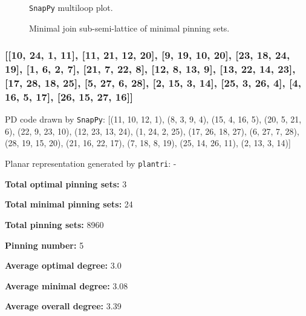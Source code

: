\documentclass{article}%
\begin{document}
\begin{multicols}{2}
\begin{figure}[H]
\centering

\caption{\texttt{SnapPy} multiloop plot.}
\label{fig:tex/img/[[7, 22, 8, 1], [13, 6, 14, 7], [14, 21, 15, 22], [8, 15, 9, 16], [1, 16, 2, 17], [12, 28, 13, 23], [5, 27, 6, 28], [20, 26, 21, 27], [9, 26, 10, 25], [2, 25, 3, 24], [17, 24, 18, 23], [4, 11, 5, 12],.svg}
\end{figure}
\columnbreak

\begin{figure}[H]
\centering
\scalebox{0.8}{}
\caption{Minimal join sub-semi-lattice of minimal pinning sets.}
\label{fig:tex/img/[[7, 22, 8, 1], [13, 6, 14, 7], [14, 21, 15, 22], [8, 15, 9, 16], [1, 16, 2, 17], [12, 28, 13, 23], [5, 27, 6, 28], [20, 26, 21, 27], [9, 26, 10, 25], [2, 25, 3, 24], [17, 24, 18, 23], [4, 11, 5, 12],.pgf}
\end{figure}
\end{multicols}

\newpage

\subsubsection{[[10, 24, 1, 11], [11, 21, 12, 20], [9, 19, 10, 20], [23, 18, 24, 19], [1, 6, 2, 7], [21, 7, 22, 8], [12, 8, 13, 9], [13, 22, 14, 23], [17, 28, 18, 25], [5, 27, 6, 28], [2, 15, 3, 14], [25, 3, 26, 4], [4, 16, 5, 17], [26, 15, 27, 16]]}

{\small\noindent PD code drawn by \texttt{SnapPy}: [(11, 10, 12, 1), (8, 3, 9, 4), (15, 4, 16, 5), (20, 5, 21, 6), (22, 9, 23, 10), (12, 23, 13, 24), (1, 24, 2, 25), (17, 26, 18, 27), (6, 27, 7, 28), (28, 19, 15, 20), (21, 16, 22, 17), (7, 18, 8, 19), (25, 14, 26, 11), (2, 13, 3, 14)]}

{\small\noindent Planar representation generated by \texttt{plantri}: -}

\begin{multicols}{2}
{\normalsize \noindent\textbf{Total optimal pinning sets:} 3

\noindent\textbf{Total minimal pinning sets:} 24

\noindent\textbf{Total pinning sets:} 8960

\noindent\textbf{Pinning number:} 5

}
\columnbreak

{\normalsize \noindent\textbf{Average optimal degree:} 3.0

\noindent\textbf{Average minimal degree:} 3.08

\noindent\textbf{Average overall degree:} 3.39

}
\end{multicols}
\end{document}

